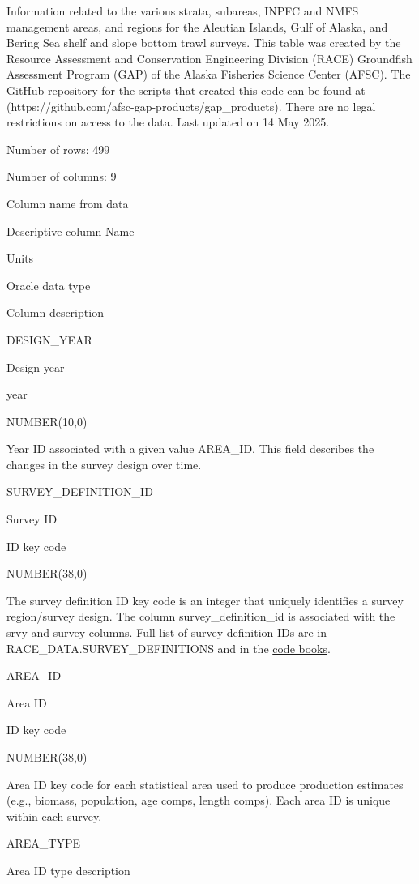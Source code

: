 \documentclass[
  letterpaper,
  oneside,
  open=any]{scrbook}
\begin{document}
Information related to the various strata, subareas, INPFC and NMFS
management areas, and regions for the Aleutian Islands, Gulf of Alaska,
and Bering Sea shelf and slope bottom trawl surveys. This table was
created by the Resource Assessment and Conservation Engineering Division
(RACE) Groundfish Assessment Program (GAP) of the Alaska Fisheries
Science Center (AFSC). The GitHub repository for the scripts that
created this code can be found at
(https://github.com/afsc-gap-products/gap\_products). There are no legal
restrictions on access to the data. Last updated on 14 May 2025.

Number of rows: 499

Number of columns: 9

Column name from data

Descriptive column Name

Units

Oracle data type

Column description

DESIGN\_YEAR

Design year

year

NUMBER(10,0)

Year ID associated with a given value AREA\_ID. This field describes the
changes in the survey design over time.

SURVEY\_DEFINITION\_ID

Survey ID

ID key code

NUMBER(38,0)

The survey definition ID key code is an integer that uniquely identifies
a survey region/survey design. The column survey\_definition\_id is
associated with the srvy and survey columns. Full list of survey
definition IDs are in RACE\_DATA.SURVEY\_DEFINITIONS and in the
\href{https://www.fisheries.noaa.gov/resource/document/groundfish-survey-species-code-manual-and-data-codes-manual}{code
books}.

AREA\_ID

Area ID

ID key code

NUMBER(38,0)

Area ID key code for each statistical area used to produce production
estimates (e.g., biomass, population, age comps, length comps). Each
area ID is unique within each survey.

AREA\_TYPE

Area ID type description
\end{document}
